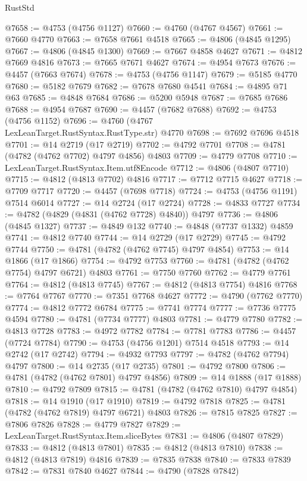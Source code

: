 \begin{lexlean}{RustStd}
\begin{coremodule}
@7658 := @4753 (@4756 @1127)
@7660 := @4760 (@4767 @4567)
@7661 := @7660 @4770
@7663 := @7658 @7661 @4518
@7665 := @4806 (@4845 @1295)
@7667 := @4806 (@4845 @1300)
@7669 := @7667 @4858 @4627
@7671 := @4812 @7669 @4816
@7673 := @7665 @7671 @4627
@7674 := @4954 @7673
@7676 := @4457 (@7663 @7674)
@7678 := @4753 (@4756 @1147)
@7679 := @5185 @4770
@7680 := @5182 @7679
@7682 := @7678 @7680 @4541
@7684 := @4895 @71 @63
@7685 := @4848 @7684
@7686 := @5200 @5948
@7687 := @7685 @7686
@7688 := @4954 @7687
@7690 := @4457 (@7682 @7688)
@7692 := @4753 (@4756 @1152)
@7696 := @4760 (@4767 LexLeanTarget.RustSyntax.RustType.str) @4770
@7698 := @7692 @7696 @4518
@7701 := @14 @2719 (@17 @2719)
@7702 := @4792 @7701
@7708 := @4781 (@4782 (@4762 @7702) @4797 @4856) @4803
@7709 := @4779 @7708
@7710 := LexLeanTarget.RustSyntax.Item.utf8Encode
@7712 := @4806 (@4807 @7710)
@7715 := @4812 (@4813 @7702) @4816
@7717 := @7712 @7715 @4627
@7718 := @7709 @7717
@7720 := @4457 (@7698 @7718)
@7724 := @4753 (@4756 @1191) @7514 @6014
@7727 := @14 @2724 (@17 @2724)
@7728 := @4833 @7727
@7734 := @4782 (@4829 (@4831 (@4762 @7728) @4840)) @4797
@7736 := @4806 (@4845 @1327)
@7737 := @4849 @132
@7740 := @4848 (@7737 @1332) @4859
@7741 := @4812 @7740
@7744 := @14 @2729 (@17 @2729)
@7745 := @4792 @7744
@7750 := @4781 (@4782 (@4762 @7745) @4797 @4854)
@7753 := @14 @1866 (@17 @1866)
@7754 := @4792 @7753
@7760 := @4781 (@4782 (@4762 @7754) @4797 @6721) @4803
@7761 := @7750 @7760
@7762 := @4779 @7761
@7764 := @4812 (@4813 @7745)
@7767 := @4812 (@4813 @7754) @4816
@7768 := @7764 @7767
@7770 := @7351 @7768 @4627
@7772 := @4790 (@7762 @7770)
@7774 := @4812 @7772 @6784
@7775 := @7741 @7774
@7777 := @7736 @7775 @4594
@7780 := @4781 (@7734 @7777) @4803
@7781 := @4779 @7780
@7782 := @4813 @7728
@7783 := @4972 @7782
@7784 := @7781 @7783
@7786 := @4457 (@7724 @7784)
@7790 := @4753 (@4756 @1201) @7514 @4518
@7793 := @14 @2742 (@17 @2742)
@7794 := @4932 @7793
@7797 := @4782 (@4762 @7794) @4797
@7800 := @14 @2735 (@17 @2735)
@7801 := @4792 @7800
@7806 := @4781 (@4782 (@4762 @7801) @4797 @4856)
@7809 := @14 @1888 (@17 @1888)
@7810 := @4792 @7809
@7815 := @4781 (@4782 (@4762 @7810) @4797 @4854)
@7818 := @14 @1910 (@17 @1910)
@7819 := @4792 @7818
@7825 := @4781 (@4782 (@4762 @7819) @4797 @6721) @4803
@7826 := @7815 @7825
@7827 := @7806 @7826
@7828 := @4779 @7827
@7829 := LexLeanTarget.RustSyntax.Item.sliceBytes
@7831 := @4806 (@4807 @7829)
@7833 := @4812 (@4813 @7801)
@7835 := @4812 (@4813 @7810)
@7838 := @4812 (@4813 @7819) @4816
@7839 := @7835 @7838
@7840 := @7833 @7839
@7842 := @7831 @7840 @4627
@7844 := @4790 (@7828 @7842)

\end{coremodule}
\end{lexlean}

